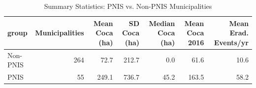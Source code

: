 \begin{table}[!h]
\centering
\caption{Summary Statistics: PNIS vs. Non-PNIS Municipalities}
\centering
\begin{tabular}[t]{lrrrrrr}
\toprule
group & Municipalities & Mean Coca (ha) & SD Coca (ha) & Median Coca (ha) & Mean Coca 2016 & Mean Erad. Events/yr\\
\midrule
Non-PNIS & 264 & 72.7 & 212.7 & 0.0 & 61.6 & 10.6\\
PNIS & 55 & 249.1 & 736.7 & 45.2 & 163.5 & 58.2\\
\bottomrule
\end{tabular}
\end{table}
